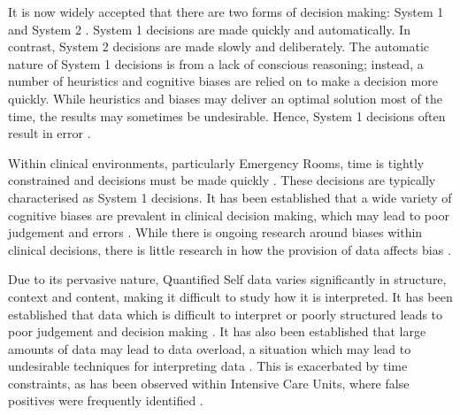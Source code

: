 \documentclass{chi-ext}
\begin{document}
  It is now widely accepted that there are two forms of decision making: System 1 and System 2 \cite{Kahneman2012}. System 1 decisions are made quickly and automatically. In contrast, System 2 decisions are made slowly and deliberately. The automatic nature of System 1 decisions is from a lack of conscious reasoning; instead, a number of heuristics and cognitive biases are relied on to make a decision more quickly. While heuristics and biases may deliver an optimal solution most of the time, the results may sometimes be undesirable. Hence, System 1 decisions often result in error \cite{Kahneman2012}.

  Within clinical environments, particularly Emergency Rooms, time is tightly constrained and decisions must be made quickly \cite{Croskerry2014}. These decisions are typically characterised as System 1 decisions. It has been established that a wide variety of cognitive biases are prevalent in clinical decision making, which may lead to poor judgement and errors \cite{Croskerry2014}. While there is ongoing research around biases within clinical decisions, there is little research in how the provision of data affects bias \cite{Croskerry2002}. 

  Due to its pervasive nature, Quantified Self data varies significantly in structure, context and content, making it difficult to study how it is interpreted. It has been established that data which is difficult to interpret or poorly structured leads to poor judgement and decision making \cite{Neale2001}. It has also been established that large amounts of data may lead to data overload, a situation which may lead to undesirable techniques for interpreting data \cite{Mcintosh2002}. This is exacerbated by time constraints, as has been observed within Intensive Care Units, where false positives were frequently identified \cite{Mcintosh2002}.   


\end{document}

